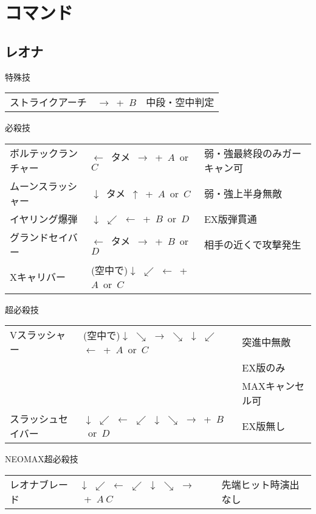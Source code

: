 \documentclass[a4j,11pt]{jarticle}
\def\vtame{$\downarrow$\ タメ\ $\uparrow$}
\def\htame{$\leftarrow$\ タメ\ $\rightarrow$}
\def\tatsu{$\downarrow$ $\swarrow$ $\leftarrow$}%
\def\ryuko{$\downarrow$ $\searrow$ $\rightarrow$ $\searrow$ $\downarrow$ $\swarrow$ $\leftarrow$}%
\def\orochi{$\downarrow$ $\swarrow$ $\leftarrow$ $\swarrow$ $\downarrow$ $\searrow$ $\rightarrow$}%
\begin{document}
\section{コマンド}
\subsection{レオナ}
\begin{itembox}[l]{特殊技}
\begin{tabular}{lll}
ストライクアーチ&$\rightarrow$\ +\ $B$&中段・空中判定\\
\end{tabular}
\end{itembox}
\begin{itembox}[l]{必殺技}
\begin{tabular}{lll}
ボルテックランチャー&\htame\ +\ $A$\ or\ $C$&弱・強最終段のみガーキャン可\\
ムーンスラッシャー&\vtame\ +\ $A$\ or\ $C$&弱・強上半身無敵\\
イヤリング爆弾&\tatsu\ +\ $B$\ or\ $D$&EX版弾貫通\\
グランドセイバー&\htame\ +\ $B$\ or\ $D$&相手の近くで攻撃発生\\
Xキャリバー&(空中で)\tatsu\ +\ $A$\ or\ $C$&
\end{tabular}
\end{itembox}
\begin{itembox}[l]{超必殺技}
\begin{tabular}{lll}
Vスラッシャー&(空中で)\ryuko\ +\ $A$\ or\ $C$&突進中無敵\\
&&EX版のみ\\
&&MAXキャンセル可\\
スラッシュセイバー&\orochi\ +\ $B$\ or\ $D$&EX版無し
\end{tabular}
\end{itembox}
\begin{itembox}[l]{NEOMAX超必殺技}
\begin{tabular}{lll}
レオナブレード&\orochi\ +\ $A\ C$&先端ヒット時演出なし
\end{tabular}
\end{itembox}
\newpage
\end{document}
